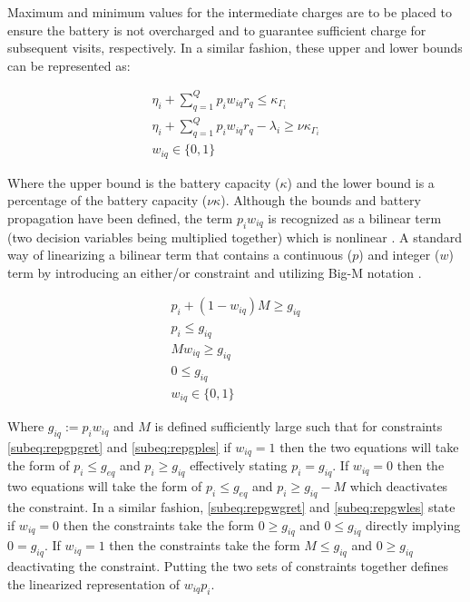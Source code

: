 \documentclass[letterpaper, 10pt, conference]{IEEEtran}
\begin{document}
Maximum and minimum values for the intermediate charges are to be placed to ensure the battery is not overcharged and to guarantee sufficient charge for subsequent visits, respectively. In a similar fashion, these upper and lower bounds can be represented as:

\begin{subequations}
\begin{align*}
    \eta_i + \sum_{q=1}^Q p_i w_{iq} r_q \leq \kappa_{\Gamma_i}                 \\
    \eta_i + \sum_{q=1}^Q p_i w_{iq} r_q - \lambda_i \geq \nu \kappa_{\Gamma_i} \\
    w_{iq} \in \{0,1\}
\end{align*}
\end{subequations}

Where the upper bound is the battery capacity (\(\kappa\)) and the lower bound is a percentage of the battery capacity (\(\nu \kappa\)). Although the bounds and battery propagation have been defined, the term \(p_i w_{iq}\) is recognized as a bilinear term (two decision variables being multiplied together) which is nonlinear \cite{Rodriguez2013}. A standard way of linearizing a bilinear term that contains a continuous (\(p\)) and integer (\(w\)) term by introducing an either/or constraint and utilizing Big-M notation \cite{Chen2010,Rodriguez2013}.

\begin{subequations}
\begin{align}
    p_i + (1 - w_{iq})M \geq g_{iq}                                           \label{subeq:repgpgret}       \\
    p_i \leq g_{iq}                                                           \label{subeq:repgples}        \\
    Mw_{iq} \geq g_{iq}                                                       \label{subeq:repgwgret}       \\
    0 \leq g_{iq}                                                             \label{subeq:repgwles}        \\
    w_{iq} \in \{0,1\}
\end{align}
\end{subequations}

Where \(g_{iq} := p_i w_{iq}\) and \(M\) is defined sufficiently large such that for constraints \eqref{subeq:repgpgret} and \eqref{subeq:repgples} if \(w_{iq} = 1\) then the two equations will take the form of \(p_i \leq g_{eq}\) and \(p_i \geq g_{iq}\) effectively stating \(p_i = g_{iq}\). If \(w_{iq} = 0\) then the two equations will take the form of \(p_i \leq g_{eq}\) and \(p_i \geq g_{iq} - M\) which deactivates the constraint. In a similar fashion, \eqref{subeq:repgwgret} and \eqref{subeq:repgwles} state if \(w_{iq} = 0\) then the constraints take the form \(0 \geq g_{iq}\) and \(0 \leq g_{iq}\) directly implying \(0 = g_{iq}\). If \(w_{iq} = 1\) then the constraints take the form \(M \leq g_{iq}\) and \(0 \geq g_{iq}\) deactivating the constraint. Putting the two sets of constraints together defines the linearized representation of \(w_{iq} p_i\).
\end{document}
